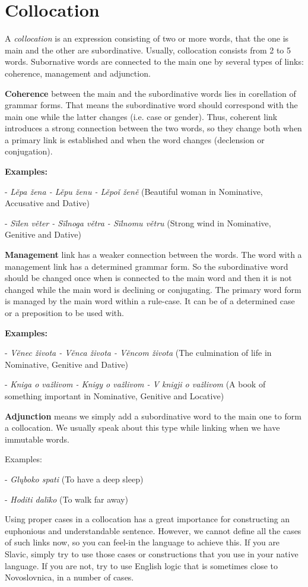 \section{Collocation}

A \textit{collocation} is an expression consisting of two or more words, that the one is main and the other are subordinative. \cite{colloc} Usually, collocation consists from 2 to 5 words. Subornative words are connected to the main one by several types of links: coherence, management and adjunction.

\textbf{Coherence} between the main and the subordinative words lies in corellation of grammar forms. That means the subordinative word should correspond with the main one while the latter changes (i.e. case or gender). Thus, coherent link introduces a strong connection between the two words, so they change both when a primary link is established and when the word changes (declension or conjugation).

\textbf{Examples:}

- \textit{Lěpa žena - Lěpu ženu - Lěpoǐ ženě} (Beautiful woman in Nominative, Accusative and Dative)

- \textit{Sïlen věter - Sïlnoga větra - Sïlnomu větru} (Strong wind in Nominative, Genitive and Dative)

\textbf{Management} link has a weaker connection between the words. The word with a management link has a determined grammar form. So the subordinative word should be changed once when is connected to the main word and then it is not changed while the main word is declining or conjugating. The primary word form is managed by the main word within a rule-case. It can be of a determined case or a preposition to be used with.

\textbf{Examples:}

- \textit{Věnec života - Věnca života - Věncom života} (The culmination of life in Nominative, Genitive and Dative)

- \textit{Kniga o važlivom - Knigy o važlivom - V knigji o važlivom} (A book of something important in Nominative, Genitive and Locative)

\textbf{Adjunction} means we simply add a subordinative word to the main one to form a collocation. We usually speak about this type while linking when we have immutable words.

Examples:

- \textit{Glųboko spati} (To have a deep sleep)

- \textit{Hoditi dalïko} (To walk far away)

Using proper cases in a collocation has a great importance for constructing an euphonious and understandable sentence. However, we cannot define all the cases of such links now, so you can feel-in the language to achieve this. If you are Slavic, simply try to use those cases or constructions that you use in your native language. If you are not, try to use English logic that is sometimes close to Novoslovnica, in a number of cases.